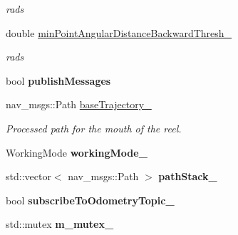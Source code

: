 \begin{DoxyCompactItemize}
\begin{DoxyCompactList}\small\item\em rads \end{DoxyCompactList}\item 
double \hyperlink{classsmacc__odom__tracker_1_1OdomTracker_ac7cac171a63c8981f8233f71c94d0776}{min\+Point\+Angular\+Distance\+Backward\+Thresh\+\_\+}\hypertarget{classsmacc__odom__tracker_1_1OdomTracker_ac7cac171a63c8981f8233f71c94d0776}{}\label{classsmacc__odom__tracker_1_1OdomTracker_ac7cac171a63c8981f8233f71c94d0776}

\begin{DoxyCompactList}\small\item\em rads \end{DoxyCompactList}\item 
bool {\bfseries publish\+Messages}\hypertarget{classsmacc__odom__tracker_1_1OdomTracker_a5aaa7b76cae6ed70524d0f2ac04cbe70}{}\label{classsmacc__odom__tracker_1_1OdomTracker_a5aaa7b76cae6ed70524d0f2ac04cbe70}

\item 
nav\+\_\+msgs\+::\+Path \hyperlink{classsmacc__odom__tracker_1_1OdomTracker_ac3a17be46ab833632c5f63e75c840dc7}{base\+Trajectory\+\_\+}\hypertarget{classsmacc__odom__tracker_1_1OdomTracker_ac3a17be46ab833632c5f63e75c840dc7}{}\label{classsmacc__odom__tracker_1_1OdomTracker_ac3a17be46ab833632c5f63e75c840dc7}

\begin{DoxyCompactList}\small\item\em Processed path for the mouth of the reel. \end{DoxyCompactList}\item 
Working\+Mode {\bfseries working\+Mode\+\_\+}\hypertarget{classsmacc__odom__tracker_1_1OdomTracker_ad011432ae35a533fd61bae43179c3c36}{}\label{classsmacc__odom__tracker_1_1OdomTracker_ad011432ae35a533fd61bae43179c3c36}

\item 
std\+::vector$<$ nav\+\_\+msgs\+::\+Path $>$ {\bfseries path\+Stack\+\_\+}\hypertarget{classsmacc__odom__tracker_1_1OdomTracker_a6cdd5d1199cf4638d70a2232081ac076}{}\label{classsmacc__odom__tracker_1_1OdomTracker_a6cdd5d1199cf4638d70a2232081ac076}

\item 
bool {\bfseries subscribe\+To\+Odometry\+Topic\+\_\+}\hypertarget{classsmacc__odom__tracker_1_1OdomTracker_a394c4040c01f687c427d34c0ab50ba3e}{}\label{classsmacc__odom__tracker_1_1OdomTracker_a394c4040c01f687c427d34c0ab50ba3e}

\item 
std\+::mutex {\bfseries m\+\_\+mutex\+\_\+}\hypertarget{classsmacc__odom__tracker_1_1OdomTracker_ad65e52bfd236e073940808c35f2bed8c}{}\label{classsmacc__odom__tracker_1_1OdomTracker_ad65e52bfd236e073940808c35f2bed8c}

\end{DoxyCompactItemize}


